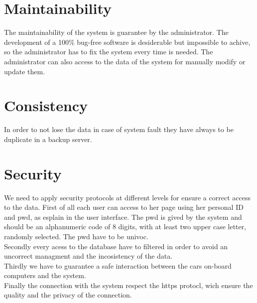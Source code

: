 \section{Maintainability}
The maintainability of the system is guarantee by the administrator. The development of a 100\% bug-free software is desiderable but impossible to achive, so the administrator has to fix the system every time is needed. The administrator can also access to the data of the system for manually modify or update them.

\section{Consistency}
In order to not lose the data in case of system fault they have always to be duplicate in a backup server.  

\section{Security}
We need to apply security protocols at different levels for ensure a correct access to the data. First of all each user can access to her page using her personal \gls{ID} and \gls{pwd}, as esplain in the user interface. The \gls{pwd} is gived by the system and should be an alphanumeric code of 8 digits, with at least two upper case letter, randomly selected. The \gls{pwd} have to be univoc. %
\\Secondly every acess to the database have to filtered in order to avoid an uncorrect managment and the incosistency of the data.
\\Thirdly we have to guarantee a safe interaction between the cars on-board computers and the system. 
\\Finally the connection with the system respect the https protocl, wich ensure the quality and the privacy of the connection.

